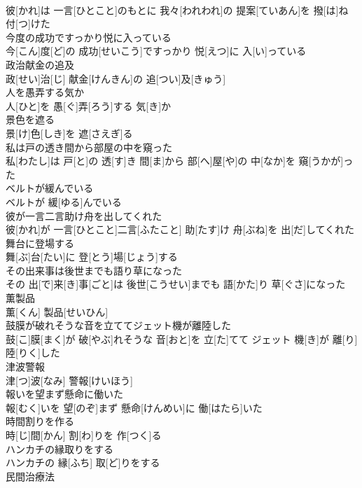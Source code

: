 \documentclass[8pt]{extreport}
\begin{document}
\begin{CJK}{UTF8}{min}
\\	彼[かれ]は 一言[ひとこと]のもとに 我々[われわれ]の 提案[ていあん]を 撥[は]ね 付[つ]けた
\\	今度の成功ですっかり悦に入っている	
\\	今[こん]度[ど]の 成功[せいこう]ですっかり 悦[えつ]に 入[い]っている
\\	政治献金の追及	
\\	政[せい]治[じ] 献金[けんきん]の 追[つい]及[きゅう]
\\	人を愚弄する気か	
\\	人[ひと]を 愚[ぐ]弄[ろう]する 気[き]か
\\	景色を遮る	
\\	景[け]色[しき]を 遮[さえぎ]る
\\	私は戸の透き間から部屋の中を窺った	
\\	私[わたし]は 戸[と]の 透[す]き 間[ま]から 部[へ]屋[や]の 中[なか]を 窺[うかが]った
\\	ベルトが緩んでいる	
\\	ベルトが 緩[ゆる]んでいる
\\	彼が一言二言助け舟を出してくれた	
\\	彼[かれ]が 一言[ひとこと]二言[ふたこと] 助[たす]け 舟[ぶね]を 出[だ]してくれた
\\	舞台に登場する	
\\	舞[ぶ]台[たい]に 登[とう]場[じょう]する
\\	その出来事は後世までも語り草になった	
\\	その 出[で]来[き]事[ごと]は 後世[こうせい]までも 語[かた]り 草[ぐさ]になった
\\	薫製品	
\\	薫[くん] 製品[せいひん]
\\	鼓膜が破れそうな音を立ててジェット機が離陸した	
\\	鼓[こ]膜[まく]が 破[やぶ]れそうな 音[おと]を 立[た]てて ジェット 機[き]が 離[り]陸[りく]した
\\	津波警報	
\\	津[つ]波[なみ] 警報[けいほう]
\\	報いを望まず懸命に働いた	
\\	報[むく]いを 望[のぞ]まず 懸命[けんめい]に 働[はたら]いた
\\	時間割りを作る	
\\	時[じ]間[かん] 割[わ]りを 作[つく]る
\\	ハンカチの縁取りをする	
\\	ハンカチの 縁[ふち] 取[ど]りをする
\\	民間治療法	

\end{CJK}
\end{document}
